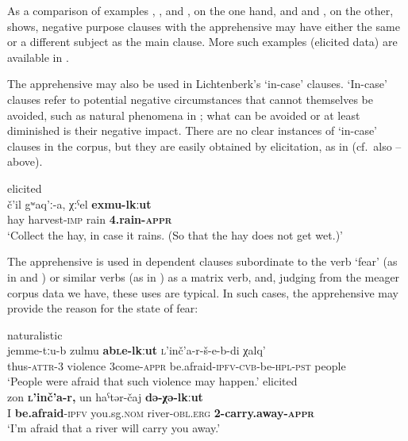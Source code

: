 \documentclass[output=paper,colorlinks,citecolor=brown]{langscibook}
\begin{document}
 As a comparison of examples , ,  and , on the one hand, and  and , on the other, shows, negative purpose clauses with the apprehensive may have either the same or a different subject as the main clause. More such examples (elicited data) are available in \citet[292]{Kibrik1977}.

The apprehensive may also be used in Lichtenberk's `in-case' clauses. `In-case' clauses refer to potential negative circumstances that cannot themselves be avoided, such as natural phenomena in ; what can be avoided or at least diminished is their negative impact. There are no clear instances of `in-case' clauses in the corpus, but they are easily obtained by elicitation, as in  (cf.\ also -- above).

\ea \label{ex:DD20} \textnormal{elicited} \\
\gll č'il gʷaq'ː-a,  χːˁel \textbf{exmu-lkːut} \\
hay harvest-\textsc{imp} rain \textbf{4.rain-\textsc{appr}} \\
\glt `Collect the hay, in case it rains. (So that the hay does not get wet.)'
\z

 The apprehensive is used in dependent clauses subordinate to the verb `fear' (as in  and ) or similar verbs (as in ) as a matrix verb, and, judging from the meager corpus data we have, these uses are typical. In such cases, the apprehensive may provide the reason for the state of fear:

    \ea \label{ex:DD21} \textnormal{naturalistic} \\
\gll jemme-tːu-b zulmu \textbf{a{\textlangle}b{\textrangle}\textsc{l}e-lkːut} \textsc{l}'inč'a-r-š-e-b-di χalq' \\
thus-\textsc{attr}-3 violence {\textlangle}3{\textrangle}come-\textsc{appr} be.afraid-\textsc{ipfv-cvb}-be-\textsc{hpl-pst} people \\
\glt `People were afraid that such violence may happen.'
\z
\newpage
\ea \label{ex:DD22} \textnormal{elicited} \\
\gll zon \textbf{\textsc{l}'inč'a-r,} un haˁtər-čaj \textbf{də-χə-lkːut} \\
I \textbf{be.afraid}-\textsc{ipfv} you.sg\textsc{.nom} river-\textsc{obl.erg} \textbf{2-carry.away-\textsc{appr}} \\
\glt `I'm afraid that a river will carry you away.'
\z
\end{document}
